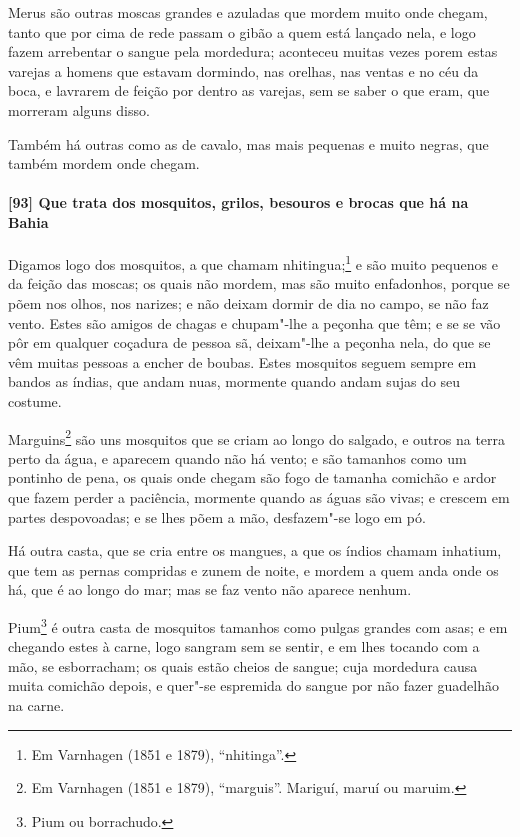 Merus são outras moscas grandes e azuladas que mordem muito onde chegam, tanto que por
cima de rede passam o gibão a quem está lançado nela, e logo fazem arrebentar o sangue
pela mordedura; aconteceu muitas vezes porem estas varejas a homens que estavam dormindo,
nas orelhas, nas ventas e no céu da boca, e lavrarem de feição por dentro as varejas, sem
se saber o que eram, que morreram alguns disso.

Também há outras como as de cavalo, mas mais pequenas e muito negras, que também mordem
onde chegam.

\paragraph{[93] Que trata dos mosquitos, grilos, besouros e brocas que há na Bahia}\quad
Digamos logo dos mosquitos, a que chamam nhitingua;\footnote{ Em Varnhagen (1851 e 1879),
``nhitinga''.} e são muito pequenos e da feição das moscas; os quais não mordem, mas são
muito enfadonhos, porque se põem nos olhos, nos narizes; e não deixam dormir de dia no
campo, se não faz vento. Estes são amigos de chagas e chupam"-lhe a peçonha que têm; e se
se vão pôr em qualquer coçadura de pessoa sã, deixam"-lhe a peçonha nela, do que se vêm
muitas pessoas a encher de boubas. Estes mosquitos seguem sempre em bandos as índias, que
andam nuas, mormente quando andam sujas do seu costume.

Marguins\footnote{ Em Varnhagen (1851 e 1879), ``marguis''. Mariguí, maruí ou maruim.} são
uns mosquitos que se criam ao longo do salgado, e outros na terra perto da água, e
aparecem quando não há vento; e são tamanhos como um pontinho de pena, os quais onde
chegam são fogo de tamanha comichão e ardor que fazem perder a paciência, mormente quando
as águas são vivas; e crescem em partes despovoadas; e se lhes põem a mão, desfazem"-se
logo em pó.

Há outra casta, que se cria entre os mangues, a que os índios chamam inhatium, que tem as
pernas compridas e zunem de noite, e mordem a quem anda onde os há, que é ao longo do mar;
mas se faz vento não aparece nenhum.

Pium\footnote{ Pium ou borrachudo.} é outra casta de mosquitos tamanhos como pulgas
grandes com asas; e em chegando estes à carne, logo sangram sem se sentir, e em lhes
tocando com a mão, se esborracham; os quais estão cheios de sangue; cuja mordedura causa
muita comichão depois, e quer"-se espremida do sangue por não fazer guadelhão na carne.


